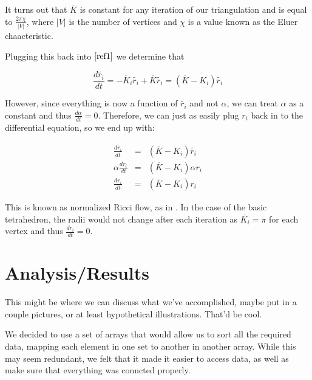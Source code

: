 \documentclass[12pt]{article}
\begin{document}
\noindent It turns out that $\overline{K}$ is constant for any iteration of our triangulation and is equal to $\displaystyle\frac{2\pi\chi}{|V|}$, where $|V|$ is the number of vertices and $\chi$ is a value known as the Eluer chaacteristic. \newline

\noindent Plugging this back into $\ref{ref1}$ we determine that

\begin{equation}
\frac{d\tilde{r_i}}{dt} = -\tilde{K_i}\tilde{r_i} + \overline{K}\tilde{r_i} = (\overline{K} - K_i)\tilde{r_i}
\end{equation}

\noindent However, since everything is now a function of $\tilde{r_i}$ and not $\alpha$, we can treat $\alpha$ as a constant and thus $\displaystyle\frac{d\alpha}{dt} = 0$. Therefore, we can just as easily plug $r_i$ back in to the differential equation, so we end up with:

\begin{eqnarray*}
\frac{d\tilde{r_i}}{dt} &=& (\overline{K} - K_i)\tilde{r_i}\\
\alpha\frac{dr_i}{dt} &=& (\overline{K} - K_i)\alpha r_i\\
\frac{dr_i}{dt} &=& (\overline{K} - K_i)r_i
\end{eqnarray*}

\noindent This is known as normalized Ricci flow, as in \cite{chowluo}. In the case of the basic tetrahedron, the radii would not change after each iteration as $\overline{K_i} = \pi$ for each vertex and thus $\frac{dr_i}{dt} = 0$. 

\newpage
\section{Analysis/Results}
\maketitle
  This might be where we can discuss what we've accomplished, maybe put in a couple pictures, or at least hypothetical illustrations. That'd be cool.\newline
  
  We decided to use a set of arrays that would allow us to sort all the required data, mapping each element in one set to another in another array. While this may seem redundant, we felt that it made it easier to access data, as well as make sure that everything was conncted properly.\newline
  
\end{document}
